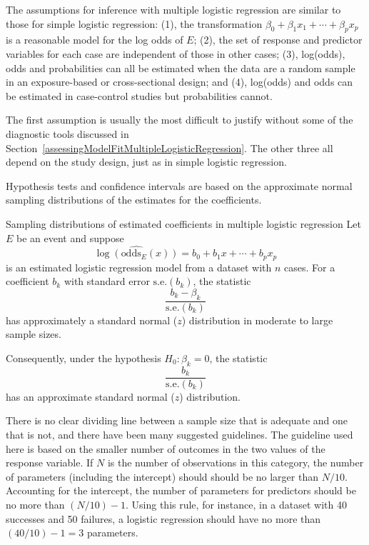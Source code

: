 The assumptions for inference with multiple logistic regression are similar to those for simple logistic regression: (1), the transformation $\beta_0 + \beta_1 x_1 + \cdots + \beta_p x_p$ is a reasonable model for the log odds of $E$; (2), the set of response and predictor variables for each case are independent of those in other cases; (3),  log(odds), odds and probabilities can all be estimated when the data are a random sample in an exposure-based or cross-sectional design; and (4), log(odds) and odds can be estimated in case-control studies but probabilities cannot.

The first assumption is usually the most difficult to justify without some of the diagnostic tools discussed in Section~\ref{assessingModelFitMultipleLogisticRegression}.  The other three all depend on the study design, just as in simple logistic regression.

Hypothesis tests and confidence intervals are based on the approximate normal sampling distributions of the estimates for the coefficients.

\begin{onebox}{Sampling distributions of estimated coefficients in multiple logistic regression}
Let $E$ be an event and suppose
\[
  \widehat{\log(\textrm{odds}_{E}(x))} = b_0 + b_1 x + \cdots + b_p x_p
\]
is an estimated logistic regression model from a dataset with $n$ cases.  For a coefficient $b_k$ with standard error $\text{s.e.}(b_k)$, the statistic
\[
      \frac{b_k - \beta_k}{\textrm{s.e.}(b_k)}
\]
has approximately a standard normal ($z$) distribution in moderate to large sample sizes.

Consequently, under the hypothesis $H_0: \beta_k = 0$, the statistic
\[
      \frac{b_k}{\textrm{s.e.}(b_k)}
\]
has an approximate standard normal ($z$) distribution.
\end{onebox}

There is no clear dividing line between a sample size that is adequate and one that is not, and there have been many suggested guidelines.  The guideline used here is based on the  smaller number of outcomes in the two values of the response variable.  If $N$ is the number of observations in this category, the number of parameters (including the intercept) should should be no larger than $N/10$.   Accounting for the intercept, the number of parameters for predictors should be no more than $(N/10) - 1$.   Using this rule, for instance, in a dataset with 40 successes and 50 failures, a logistic regression should have no more than $(40/10) - 1 = 3$ parameters.

